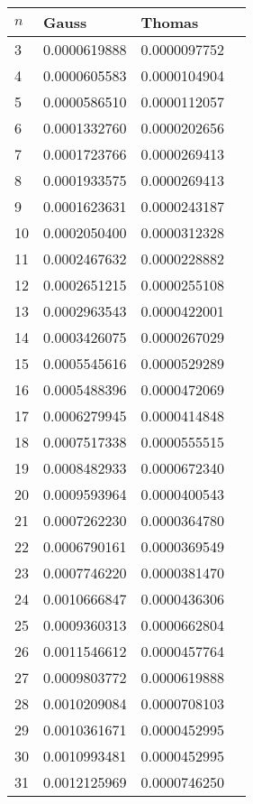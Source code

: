 \documentclass{article}
\begin{document}
\begin{table}[H]
\parbox{.45\linewidth}{
\hspace*{-1cm}
\begin{tabular}{|l|l|l|l|}
\hline
$n$ & Gauss & Thomas \\ \hline
3 & 0.0000619888 & 0.0000097752 \\ \hline
4 & 0.0000605583 & 0.0000104904 \\ \hline
5 & 0.0000586510 & 0.0000112057 \\ \hline
6 & 0.0001332760 & 0.0000202656 \\ \hline
7 & 0.0001723766 & 0.0000269413 \\ \hline
8 & 0.0001933575 & 0.0000269413 \\ \hline
9 & 0.0001623631 & 0.0000243187 \\ \hline
10 & 0.0002050400 & 0.0000312328 \\ \hline
11 & 0.0002467632 & 0.0000228882 \\ \hline
12 & 0.0002651215 & 0.0000255108 \\ \hline
13 & 0.0002963543 & 0.0000422001 \\ \hline
14 & 0.0003426075 & 0.0000267029 \\ \hline
15 & 0.0005545616 & 0.0000529289 \\ \hline
16 & 0.0005488396 & 0.0000472069 \\ \hline
17 & 0.0006279945 & 0.0000414848 \\ \hline
18 & 0.0007517338 & 0.0000555515 \\ \hline
19 & 0.0008482933 & 0.0000672340 \\ \hline
20 & 0.0009593964 & 0.0000400543 \\ \hline
21 & 0.0007262230 & 0.0000364780 \\ \hline
22 & 0.0006790161 & 0.0000369549 \\ \hline
23 & 0.0007746220 & 0.0000381470 \\ \hline
24 & 0.0010666847 & 0.0000436306 \\ \hline
25 & 0.0009360313 & 0.0000662804 \\ \hline
26 & 0.0011546612 & 0.0000457764 \\ \hline
27 & 0.0009803772 & 0.0000619888 \\ \hline
28 & 0.0010209084 & 0.0000708103 \\ \hline
29 & 0.0010361671 & 0.0000452995 \\ \hline
30 & 0.0010993481 & 0.0000452995 \\ \hline
31 & 0.0012125969 & 0.0000746250 \\ \hline

\end{tabular}}
\end{table}
\end{document}
